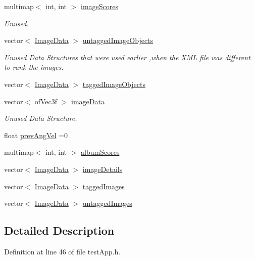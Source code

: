 \begin{DoxyCompactItemize}
multimap$<$ int, int $>$ \hyperlink{classtest_app_a9ced1a64554a911109fe8a975b95b590}{image\-Scores}
\begin{DoxyCompactList}\small\item\em Unused. \end{DoxyCompactList}\item 
vector$<$ \hyperlink{struct_image_data}{Image\-Data} $>$ \hyperlink{classtest_app_ae31cc868f554f62b4c6e4e9db3b4155b}{untagged\-Image\-Objects}
\begin{DoxyCompactList}\small\item\em Unused Data Structures that were used earlier ,when the X\-M\-L file was different to rank the images. \end{DoxyCompactList}\item 
vector$<$ \hyperlink{struct_image_data}{Image\-Data} $>$ \hyperlink{classtest_app_af65c8dc2f4620bfe7fdf6a39043cb48d}{tagged\-Image\-Objects}
\item 
vector$<$ of\-Vec3f $>$ \hyperlink{classtest_app_a500cd1228b3364bf30c8fb185e375688}{image\-Data}
\begin{DoxyCompactList}\small\item\em Unused Data Structure. \end{DoxyCompactList}\item 
float \hyperlink{classtest_app_a8a2b9b9cf76097e20f148b616297029b}{prev\-Ang\-Vel} =0
\item 
multimap$<$ int, int $>$ \hyperlink{classtest_app_aa16e3bba73f9adb3c6363ac429e5a472}{album\-Scores}
\item 
vector$<$ \hyperlink{struct_image_data}{Image\-Data} $>$ \hyperlink{classtest_app_adcd4c3dfc7257326a79e6a3fc8b33406}{image\-Details}
\item 
vector$<$ \hyperlink{struct_image_data}{Image\-Data} $>$ \hyperlink{classtest_app_a7f7226fc54fdb7d06366ed0fa3ab7ee3}{tagged\-Images}
\item 
vector$<$ \hyperlink{struct_image_data}{Image\-Data} $>$ \hyperlink{classtest_app_a9cb9aa0700c4c8b316329a86c4e650ec}{untagged\-Images}
\end{DoxyCompactItemize}


\subsection{Detailed Description}


Definition at line 46 of file test\-App.\-h.



